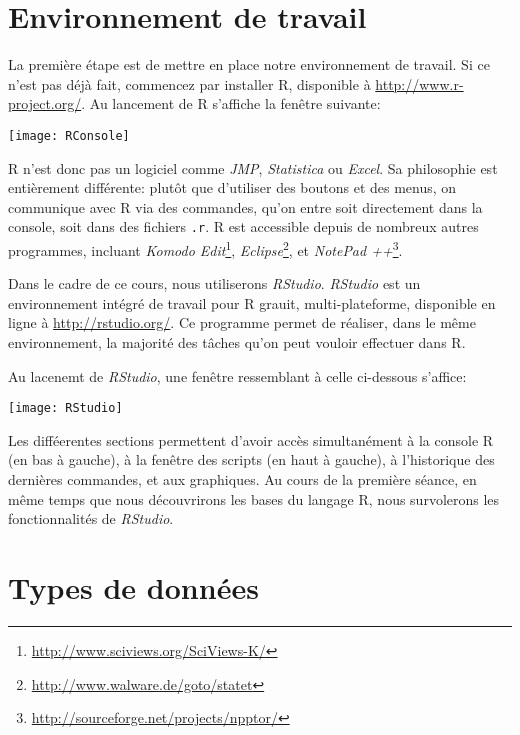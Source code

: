 \section{Environnement de travail}

La première étape est de mettre en place notre environnement de travail.
Si ce n'est pas déjà fait, commencez par installer R, disponible à \url{http://www.r-project.org/}.
Au lancement de R s'affiche la fenêtre suivante:  

\begin{center}
\texttt{[image: RConsole]}
\end{center}

R n'est donc pas un logiciel comme \emph{JMP}, \emph{Statistica} ou \emph{Excel}.
Sa philosophie est entièrement différente: plutôt que d'utiliser des boutons et des menus, on communique avec R via des commandes, qu'on entre soit directement dans la console, soit dans des fichiers \texttt{.r}.
R est accessible depuis de nombreux autres programmes, incluant \emph{Komodo Edit}\footnote{\url{http://www.sciviews.org/SciViews-K/}}, \emph{Eclipse}\footnote{\url{http://www.walware.de/goto/statet}}, et \emph{NotePad ++}\footnote{\url{http://sourceforge.net/projects/npptor/}}. 

Dans le cadre de ce cours, nous utiliserons \emph{RStudio}. 
\emph{RStudio} est un environnement intégré de travail pour R grauit, multi-plateforme, disponible en ligne à \url{http://rstudio.org/}.
Ce programme permet de réaliser, dans le même environnement, la majorité des tâches qu'on peut vouloir effectuer dans R.

Au lacenemt de \emph{RStudio}, une fenêtre ressemblant à celle ci-dessous s'affice:

\begin{center}
\texttt{[image: RStudio]}
\end{center}

Les difféerentes sections permettent d'avoir accès simultanément à la console R (en bas à gauche), à la fenêtre des scripts (en haut à gauche), à l'historique des dernières commandes, et aux graphiques.
Au cours de la première séance, en même temps que nous découvrirons les bases du langage R, nous survolerons les fonctionnalités de \emph{RStudio}. 

\section{Types de données}

